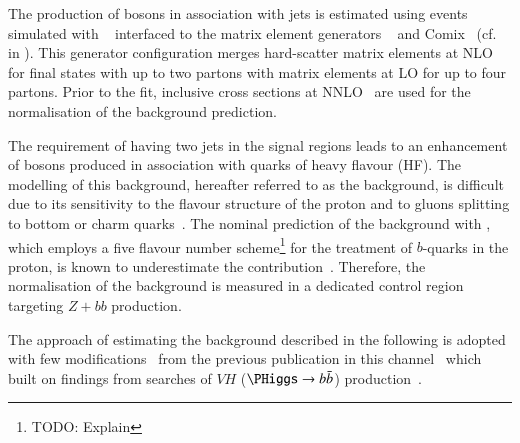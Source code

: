 %
%

The production of \PZ bosons in association with jets is estimated
using events simulated with \SHERPA[2.2.1]~\cite{Bothmann:2019yzt}
interfaced to the matrix element generators
\OPENLOOPS~\cite{Buccioni:2019sur,Cascioli:2011va,Denner:2016kdg} and
Comix~\cite{Gleisberg:2008fv} (cf.\  in
). This generator configuration merges
hard-scatter matrix elements at NLO for final states with up to two
partons with matrix elements at LO for up to four partons. Prior to
the fit, inclusive \Zjets cross sections at
NNLO~\cite{Anastasiou:2003ds} are used for the normalisation of the
background prediction.

The requirement of having two \btagged jets in the signal regions
leads to an enhancement of \PZ bosons produced in association with
quarks of heavy flavour (HF). The modelling of this background,
hereafter referred to as the \ZHF background, is difficult due to its
sensitivity to the flavour structure of the proton and to gluons
splitting to bottom or charm
quarks~\cite{Maltoni:2012pa,Napoletano:2018euk,Napoletano:2019tla}. The
nominal prediction of the \ZHF background with \SHERPA, which employs
a five flavour number scheme\footnote{TODO: Explain} for the treatment
of $b$-quarks in the proton, is known to underestimate the \ZHF
contribution~\cite{STDM-2017-38}.
Therefore, the normalisation of the \ZHF background is measured in a
dedicated control region targeting $Z + bb$ production.


The approach of estimating the \ZHF background described in the
following is adopted with few modifications~\cite{bokan} from the
previous publication in this channel~\cite{HIGG-2016-16-witherratum}
which built on findings from searches of $VH$ ($\PHiggs \to \bbbar$)
production~\cite{HIGG-2016-29}.

